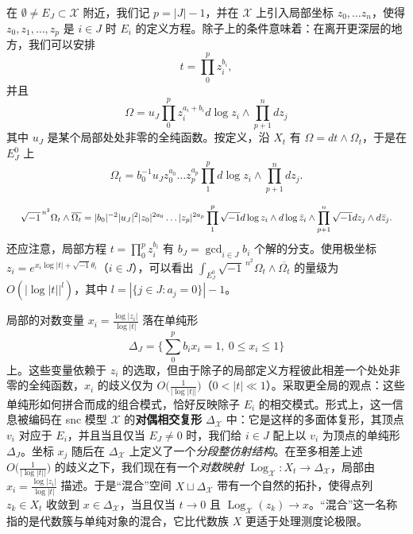 
在 $\emptyset\ne E_J\subset\mathcal{X}$ 附近，我们记 $p=|J|-1$，并在 $\mathcal{X}$ 上引入局部坐标 $z_0,\dots z_n$，使得 $z_0,z_1,\dots,z_p$ 是 $i\in J$ 时 $E_i$ 的定义方程。除子上的条件意味着：在离开更深层的地方，我们可以安排
\[
t=\prod_{0}^{p}z_i^{b_i},
\]
并且
\[
\Omega = u_J\prod_{0}^{p}z_i^{a_i+b_i}d\log z_i\wedge\prod_{p+1}^{n}dz_j
\]
其中 $u_J$ 是某个局部处处非零的全纯函数。按定义，沿 $X_t$ 有 $\Omega=dt\wedge\Omega_t$，于是在 $E^0_J$ 上
\[
\Omega_t = b_0^{-1}u_Jz_0^{a_0}\dots z_p^{a_p}\prod_{1}^{p}d\log z_i\wedge\prod_{p+1}^{n}dz_j.
\]


\[
\resizebox{0.97\textwidth}{!}{$\displaystyle \sqrt{-1}^{\,n^2}\Omega_t\wedge\overline{\Omega_t} = |b_0|^{-2}|u_J|^2|z_0|^{2a_0}\dots|z_p|^{2a_p}\prod_{1}^{p}\sqrt{-1}d\log z_i\wedge d\log\bar z_i\wedge\prod_{p+1}^{n}\sqrt{-1}dz_j\wedge d\bar z_j.$}
\]
还应注意，局部方程 $t=\prod_{0}^{p}z_i^{b_i}$ 有 $b_J=\gcd_{i\in J}b_i$ 个解的分支。使用极坐标 $z_i=e^{x_i\log|t|+\sqrt{-1}\theta_i}$（$i\in J$），可以看出 $\int_{E^0_J}\sqrt{-1}^{\,n^2}\Omega_t\wedge\overline{\Omega_t}$ 的量级为 $O(|\log|t||^{l})$，其中 $l=|\{j\in J: a_j=0\}|-1$。


局部的对数变量 $x_i=\frac{\log|z_i|}{\log|t|}$ 落在单纯形
\[
\Delta_J = \Big\{\sum_{0}^{p}b_ix_i=1,\ 0\le x_i\le1\Big\}
\]
上。这些变量依赖于 $z_i$ 的选取，但由于除子的局部定义方程彼此相差一个处处非零的全纯函数，$x_i$ 的歧义仅为 $O\big(\frac{1}{|\log|t||}\big)$（$0<|t|\ll1$）。采取更全局的观点：这些单纯形如何拼合而成的组合模式，恰好反映除子 $E_i$ 的相交模式。形式上，这一信息被编码在 snc 模型 $\mathcal{X}$ 的\textbf{对偶相交复形} $\Delta_{\mathcal{X}}$ 中：它是这样的多面体复形，其顶点 $v_i$ 对应于 $E_i$，并且当且仅当 $E_J\ne0$ 时，我们给 $i\in J$ 配上以 $v_i$ 为顶点的单纯形 $\Delta_J$。坐标 $x_j$ 随后在 $\Delta_{\mathcal{X}}$ 上定义了一个\emph{分段整仿射结构}。在至多相差上述 $O\big(\frac{1}{|\log|t||}\big)$ 的歧义之下，我们现在有一个\emph{对数映射} $\operatorname{Log}_{\mathcal{X}}:X_t\to\Delta_{\mathcal{X}}$，局部由 $x_i=\frac{\log|z_i|}{\log|t|}$ 描述。于是“混合”空间 $X\sqcup\Delta_{\mathcal{X}}$ 带有一个自然的拓扑，使得点列 $z_k\in X_t$ 收敛到 $x\in\Delta_{\mathcal{X}}$，当且仅当 $t\to0$ 且 $\operatorname{Log}_{\mathcal{X}}(z_k)\to x$。“混合”这一名称指的是代数簇与单纯对象的混合，它比代数族 $X$ 更适于处理测度论极限。

